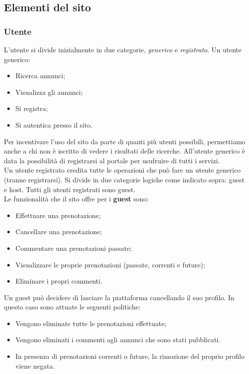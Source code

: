 \documentclass[1_relazione.tex]{subfiles}
\begin{document}
\subsection{Elementi del sito}

\subsubsection{Utente} 
L'utente si divide inizialmente in due categorie, \textit{generico} e \textit{registrato}. Un utente generico:
\begin{itemize}
\item Ricerca annunci;
\item Visualizza gli annunci;
\item Si registra;
 \item Si autentica presso il sito.
\end{itemize}
Per incentivare l'uso del sito da parte di quanti pi\`{u} utenti possibili, permettiamo anche a chi non \`{e} iscritto di vedere i risultati delle ricerche. All'utente generico \`{e} data la possibilit\`{a} di registrarsi al portale per usufruire di tutti i servizi.  \\
Un utente registrato eredita tutte le operazioni che pu\`{o} fare un utente generico (tranne registrarsi). Si divide in due categorie logiche come indicato sopra: guest e host. Tutti gli utenti registrati sono guest.\\
Le funzionalit\`{a} che il sito offre per i \textbf{guest} sono:
\begin{itemize}
\item Effettuare una prenotazione;
\item Cancellare una prenotazione;
\item Commentare una prenotazioni passate;
\item Visualizzare le proprie prenotazioni (passate, correnti e future);
\item Eliminare i propri commenti.
\end{itemize}
Un guest pu\`{o} decidere di lasciare la piattaforma cancellando il suo profilo. In questo caso sono attuate le seguenti politiche:
\begin{itemize}
\item Vengono eliminate tutte le prenotazioni effettuate;
\item Vengono eliminati i commenti agli annunci che sono stati pubblicati.
\item In presenza di prenotazioni correnti o future, la rimozione del proprio profilo viene negata.
\end{itemize}
\end{document}
